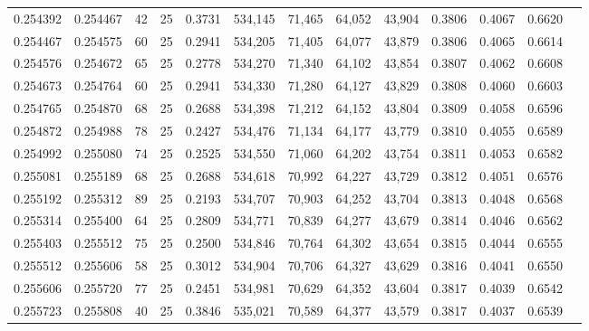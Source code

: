 \begin{tabular}{rrrrrrrrrrrrr}
0.254392 & 0.254467 &    42 &  25 &                                     0.3731 & 534,145 &  71,465 &  64,052 &  43,904 & 0.3806 & 0.4067 & 0.6620 \\
0.254467 & 0.254575 &    60 &  25 &                                     0.2941 & 534,205 &  71,405 &  64,077 &  43,879 & 0.3806 & 0.4065 & 0.6614 \\
0.254576 & 0.254672 &    65 &  25 &                                     0.2778 & 534,270 &  71,340 &  64,102 &  43,854 & 0.3807 & 0.4062 & 0.6608 \\
0.254673 & 0.254764 &    60 &  25 &                                     0.2941 & 534,330 &  71,280 &  64,127 &  43,829 & 0.3808 & 0.4060 & 0.6603 \\
0.254765 & 0.254870 &    68 &  25 &                                     0.2688 & 534,398 &  71,212 &  64,152 &  43,804 & 0.3809 & 0.4058 & 0.6596 \\
0.254872 & 0.254988 &    78 &  25 &                                     0.2427 & 534,476 &  71,134 &  64,177 &  43,779 & 0.3810 & 0.4055 & 0.6589 \\
0.254992 & 0.255080 &    74 &  25 &                                     0.2525 & 534,550 &  71,060 &  64,202 &  43,754 & 0.3811 & 0.4053 & 0.6582 \\
0.255081 & 0.255189 &    68 &  25 &                                     0.2688 & 534,618 &  70,992 &  64,227 &  43,729 & 0.3812 & 0.4051 & 0.6576 \\
0.255192 & 0.255312 &    89 &  25 &                                     0.2193 & 534,707 &  70,903 &  64,252 &  43,704 & 0.3813 & 0.4048 & 0.6568 \\
0.255314 & 0.255400 &    64 &  25 &                                     0.2809 & 534,771 &  70,839 &  64,277 &  43,679 & 0.3814 & 0.4046 & 0.6562 \\
0.255403 & 0.255512 &    75 &  25 &                                     0.2500 & 534,846 &  70,764 &  64,302 &  43,654 & 0.3815 & 0.4044 & 0.6555 \\
0.255512 & 0.255606 &    58 &  25 &                                     0.3012 & 534,904 &  70,706 &  64,327 &  43,629 & 0.3816 & 0.4041 & 0.6550 \\
0.255606 & 0.255720 &    77 &  25 &                                     0.2451 & 534,981 &  70,629 &  64,352 &  43,604 & 0.3817 & 0.4039 & 0.6542 \\
0.255723 & 0.255808 &    40 &  25 &                                     0.3846 & 535,021 &  70,589 &  64,377 &  43,579 & 0.3817 & 0.4037 & 0.6539 \\

\end{tabular}
